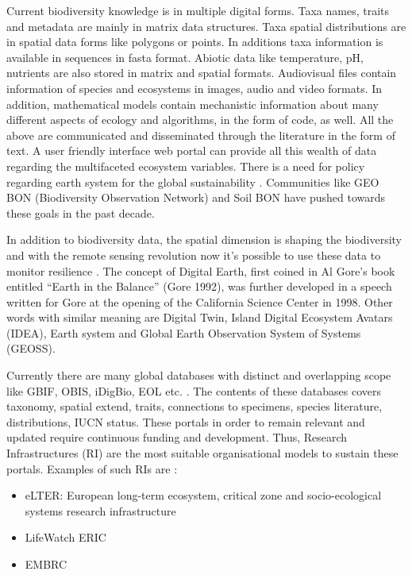 Current biodiversity knowledge is in multiple digital forms. 
Taxa names, traits and metadata are mainly in matrix data
structures. Taxa spatial distributions are in spatial data
forms like polygons or points. In additions taxa information
is available in sequences in fasta format. Abiotic data like 
temperature, pH, nutrients are also stored in matrix
and spatial formats. Audiovisual files contain information
of species and ecosystems in images, audio and video formats.
In addition, mathematical models contain mechanistic information
about many different aspects of ecology and algorithms, in the 
form of code, as well. All the above are communicated and disseminated through the
literature in the form of text. A user friendly interface web portal can provide all this wealth of data
regarding the multifaceted ecosystem variables. There is a need for policy regarding earth system for the global
sustainability \parencite{reid2010earth}. Communities like GEO BON (Biodiversity Observation Network) and Soil BON
have pushed towards these goals in the past decade.

In addition to biodiversity data, the spatial dimension is shaping the biodiversity and with the remote sensing revolution now
it's possible to use these data to monitor resilience \parencite{Lenton2022resilience}. 
The concept of Digital Earth, first coined in Al Gore’s book entitled 
“Earth in the Balance” (Gore 1992), was further developed in a speech
written for Gore at the opening of the California Science Center in 1998. Other words with
similar meaning are Digital Twin, Island Digital Ecosystem Avatars (IDEA), Earth system
and Global Earth Observation System of Systems (GEOSS).

Currently there are many global databases with distinct and overlapping 
scope like GBIF, OBIS, iDigBio, EOL etc. \parencite{feng2022Review}. 
The contents of these databases covers taxonomy, spatial extend, traits, 
connections to specimens, species literature, distributions,
IUCN status. These portals in order to remain relevant and updated require 
continuous funding and development. Thus, Research Infrastructures (RI) are 
the most suitable organisational models to sustain these portals. Examples 
of such RIs are :

\begin{itemize}

    \item eLTER: European long-term ecosystem, critical zone and socio-ecological systems research infrastructure 
    \item LifeWatch ERIC
    \item EMBRC

\end{itemize}

